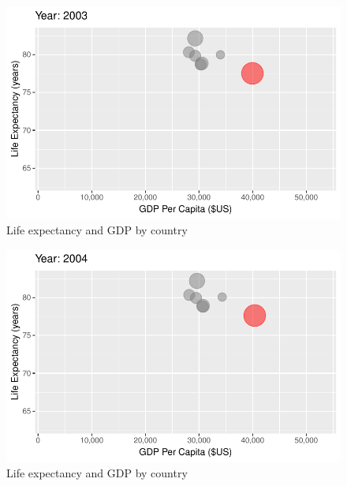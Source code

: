 \documentclass[
  letterpaper,
  DIV=11,
  numbers=noendperiod]{scrreport}
\theoremstyle{definition}
\theoremstyle{remark}
\begin{document}
\begin{figure}

{\centering \includegraphics{index_files/figure-pdf/fig-anim-country-93.pdf}

}

\caption{\label{fig-anim-country-93}Life expectancy and GDP by country}

\end{figure}

\begin{figure}

{\centering \includegraphics{index_files/figure-pdf/fig-anim-country-94.pdf}

}

\caption{\label{fig-anim-country-94}Life expectancy and GDP by country}

\end{figure}
\end{document}
